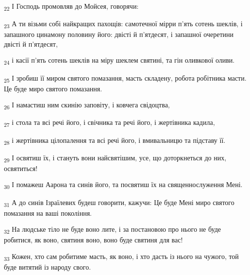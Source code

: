\begin{tcolorbox}
\textsubscript{22} І Господь промовляв до Мойсея, говорячи:
\end{tcolorbox}
\begin{tcolorbox}
\textsubscript{23} А ти візьми собі найкращих пахощів: самотечної мірри п'ять сотень шеклів, і запашного цинамону половину його: двісті й п'ятдесят, і запашної очеретини двісті й п'ятдесят,
\end{tcolorbox}
\begin{tcolorbox}
\textsubscript{24} і касії п'ять сотень шеклів на міру шеклем святині, та гін оливкової оливи.
\end{tcolorbox}
\begin{tcolorbox}
\textsubscript{25} І зробиш її миром святого помазання, масть складену, робота робітника масти. Це буде миро святого помазання.
\end{tcolorbox}
\begin{tcolorbox}
\textsubscript{26} І намастиш ним скинію заповіту, і ковчега свідоцтва,
\end{tcolorbox}
\begin{tcolorbox}
\textsubscript{27} і стола та всі речі його, і свічника та речі його, і жертівника кадила,
\end{tcolorbox}
\begin{tcolorbox}
\textsubscript{28} і жертівника цілопалення та всі речі його, і вмивальницю та підставу її.
\end{tcolorbox}
\begin{tcolorbox}
\textsubscript{29} І освятиш їх, і стануть вони найсвятішим, усе, що доторкнеться до них, освятиться!
\end{tcolorbox}
\begin{tcolorbox}
\textsubscript{30} І помажеш Аарона та синів його, та посвятиш їх на священнослуження Мені.
\end{tcolorbox}
\begin{tcolorbox}
\textsubscript{31} А до синів Ізраїлевих будеш говорити, кажучи: Це буде Мені миро святого помазання на ваші покоління.
\end{tcolorbox}
\begin{tcolorbox}
\textsubscript{32} На людське тіло не буде воно лите, і за постановою про нього не буде робитися, як воно, святиня воно, воно буде святиня для вас!
\end{tcolorbox}
\begin{tcolorbox}
\textsubscript{33} Кожен, хто сам робитиме масть, як воно, і хто дасть із нього на чужого, той буде витятий із народу свого.
\end{tcolorbox}
